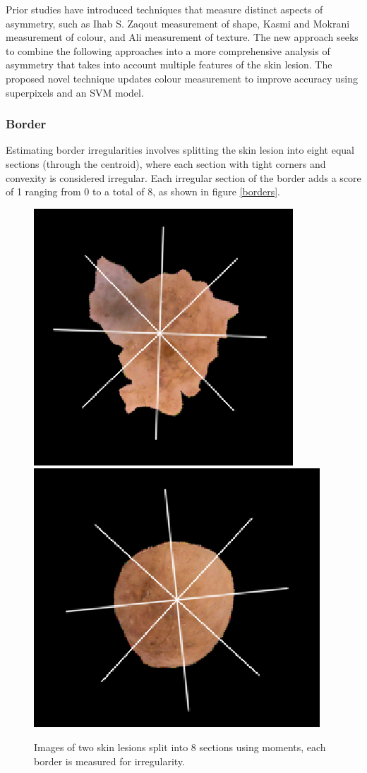 Prior studies have introduced techniques that measure distinct aspects of asymmetry, such as Ihab S. Zaqout\cite{Zaqout2016} measurement of shape, Kasmi and Mokrani\cite{Kasmi2016} measurement of colour, and  Ali\cite{Ali2020a} measurement of texture. The new approach seeks to combine the following approaches into a more comprehensive analysis of asymmetry that takes into account multiple features of the skin lesion. The proposed novel technique updates colour measurement to improve accuracy using superpixels and an SVM model.

\subsubsection{Border}
Estimating border irregularities involves splitting the skin lesion into eight equal sections (through the centroid), where each section with tight corners and convexity is considered irregular. Each irregular section of the border adds a score of 1 ranging from 0 to a total of 8, as shown in figure \ref{borders}.

\begin{figure}
	\centering
	\includegraphics[scale=0.5]{images/bord1.png}
	\includegraphics[scale=0.5]{images/bord2.png}
	\caption{Images of two skin lesions split into 8 sections using moments, each border is measured for irregularity.}
\end{figure} \label{borders}

